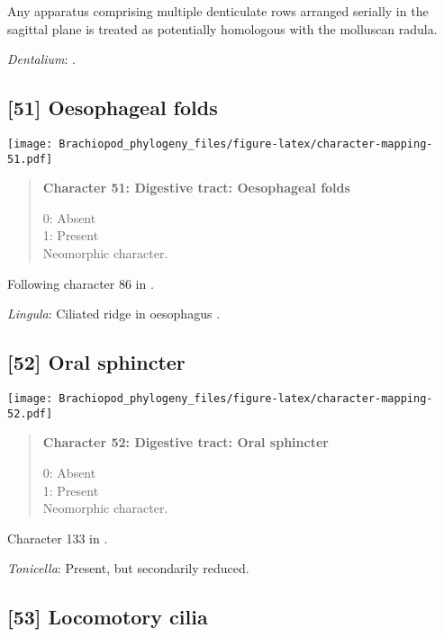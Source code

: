 \documentclass[openany]{book}
\theoremstyle{definition}
\theoremstyle{definition}
\theoremstyle{definition}
\theoremstyle{remark}
\begin{document}
Any apparatus comprising multiple denticulate rows arranged serially in
the sagittal plane is treated as potentially homologous with the
molluscan radula.

\hypertarget{Dentalium-coding-50}{}
\emph{Dentalium}: \citet{Smith2012M}.

\subsection*{{[}51{]} Oesophageal folds}\label{oesophageal-folds}

\texttt{[image: Brachiopod\_phylogeny\_files/figure-latex/character-mapping-51.pdf]}

\begin{quote}
\textbf{Character 51: Digestive tract: Oesophageal folds}

0: Absent\\
1: Present\\
Neomorphic character.
\end{quote}

Following character 86 in \citet{Giribet2002}.

\hypertarget{Lingula-coding-51}{}
\emph{Lingula}: Ciliated ridge in oesophagus \citep{Torrey1901}.

\subsection*{{[}52{]} Oral sphincter}\label{oral-sphincter}

\texttt{[image: Brachiopod\_phylogeny\_files/figure-latex/character-mapping-52.pdf]}

\begin{quote}
\textbf{Character 52: Digestive tract: Oral sphincter}

0: Absent\\
1: Present\\
Neomorphic character.
\end{quote}

Character 133 in \citet{Grobe2007}.

\hypertarget{Tonicella-coding-52}{}
\emph{Tonicella}: Present, but secondarily reduced.

\subsection*{{[}53{]} Locomotory cilia}\label{locomotory-cilia}
\end{document}
